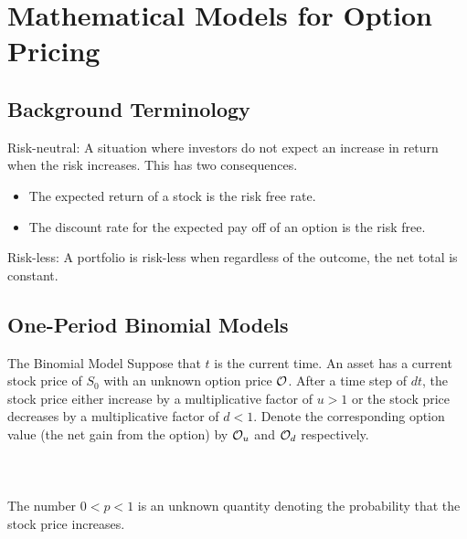 \documentclass[a4paper]{article}
\begin{document}
\pagebreak
\section{Mathematical Models for Option Pricing}
\subsection{Background Terminology}
Risk-neutral: A situation where investors do not expect an increase in return when the risk increases. This has two consequences. 
\begin{itemize}
\item The expected return of a stock is the risk free rate. 
\item The discount rate for the expected pay off of an option is the risk free. 
\end{itemize}

Risk-less: A portfolio is risk-less when regardless of the outcome, the net total is constant. 

\subsection{One-Period Binomial Models}
\begin{defn}{The Binomial Model}{} Suppose that $t$ is the current time. An asset has a current stock price of $S_0$ with an unknown option price $\mathcal{O}$. After a time step of $dt$, the stock price either increase by a multiplicative factor of $u>1$ or the stock price decreases by a multiplicative factor of $d<1$. Denote the corresponding option value (the net gain from the option) by $\mathcal{O}_u$ and $\mathcal{O}_d$ respectively. \\~\\
 \\~\\
The number $0<p<1$ is an unknown quantity denoting the probability that the stock price increases. 
\end{defn}
\end{document}
